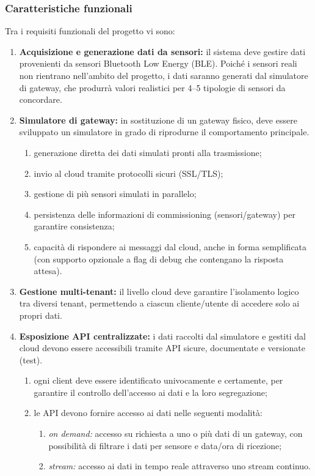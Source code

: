 \documentclass[a4paper,11pt]{article}
\begin{document}
\subsubsection{Caratteristiche funzionali}
Tra i requisiti funzionali del progetto vi sono:
\begin{enumerate}[noitemsep, topsep=0pt]
 \item \textbf{Acquisizione e generazione dati da sensori:} il sistema deve gestire dati provenienti da sensori Bluetooth Low Energy (BLE). Poiché i sensori reali non rientrano nell'ambito del progetto, i dati saranno generati dal simulatore di gateway, che produrrà valori realistici per 4--5 tipologie di sensori da concordare.

 \item \textbf{Simulatore di gateway:} in sostituzione di un gateway fisico, deve essere sviluppato un simulatore 
 in grado di riprodurne il comportamento principale.
 \begin{enumerate}
  \item generazione diretta dei dati simulati pronti alla trasmissione;
  \item invio al cloud tramite protocolli sicuri (SSL/TLS);
  \item gestione di più sensori simulati in parallelo;
  \item persistenza delle informazioni di commissioning (sensori/gateway) per garantire consistenza;
  \item capacità di rispondere ai messaggi dal cloud, anche in forma semplificata 
  (con supporto opzionale a flag di debug che contengano la risposta attesa).
 \end{enumerate}

 \item \textbf{Gestione multi-tenant:} il livello cloud deve garantire l'isolamento logico tra diversi tenant, 
 permettendo a ciascun cliente/utente di accedere solo ai propri dati.

 \item \textbf{Esposizione API centralizzate:} i dati raccolti dal simulatore e gestiti dal cloud devono essere accessibili 
 tramite API sicure, documentate e versionate (test).
 \begin{enumerate}
  \item ogni client deve essere identificato univocamente e certamente, per garantire il controllo 
  dell'accesso ai dati e la loro segregazione;
  \item le API devono fornire accesso ai dati nelle seguenti modalità:
  \begin{enumerate}
   \item \textit{on demand:} accesso su richiesta a uno o più dati di un gateway, 
   con possibilità di filtrare i dati per sensore e data/ora di ricezione;
   \item \textit{stream:} accesso ai dati in tempo reale attraverso uno stream continuo.
  \end{enumerate}
 \end{enumerate}


\end{enumerate}
\end{document}
